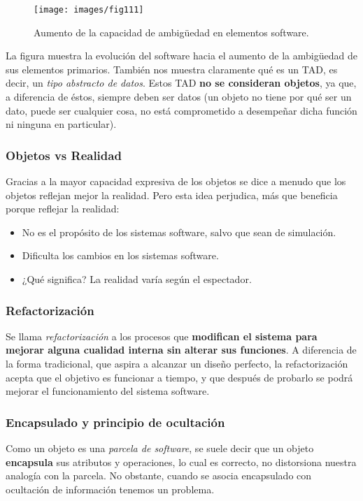 \begin{figure}[ht!]  \centering
  \texttt{[image: images/fig111]}
  \caption{Aumento de la capacidad de ambigüedad en elementos
    software.}
  \label{fig:111}
\end{figure}

La figura muestra la evolución del software hacia el aumento de la
ambigüedad de sus elementos primarios.  También nos muestra claramente
qué es un TAD, es decir, un \emph{tipo abstracto de datos}. Estos TAD
\textbf{no se consideran objetos}, ya que, a diferencia de éstos,
siempre deben ser datos (un objeto no tiene por qué ser un dato, puede
ser cualquier cosa, no está comprometido a desempeñar dicha función ni
ninguna en particular).

\subsubsection{Objetos vs Realidad} Gracias a la mayor capacidad
expresiva de los objetos se dice a menudo que los objetos reflejan
mejor la realidad.  Pero esta idea perjudica, más que beneficia porque
reflejar la realidad:
\begin{itemize}
\item No es el propósito de los sistemas software, salvo que sean de
  simulación.
\item Dificulta los cambios en los sistemas software.
\item ¿Qué significa? La realidad varía según el espectador.
\end{itemize}

\subsubsection{Refactorización}
Se llama \emph{refactorización} a los procesos que \textbf{modifican
  el sistema para mejorar alguna cualidad interna sin alterar sus
  funciones}. A diferencia de la forma tradicional, que aspira
a alcanzar un diseño perfecto, la refactorización acepta que el
objetivo es funcionar a tiempo, y que después de probarlo se podrá
mejorar el funcionamiento del sistema software.

\subsubsection{Encapsulado y principio de ocultación}
Como un objeto es una \emph{parcela de software}, se suele decir que
un objeto \textbf{encapsula} sus atributos y operaciones, lo cual es
correcto, no distorsiona nuestra analogía con la parcela. No obstante,
cuando se asocia encapsulado con ocultación de información tenemos un
problema.

